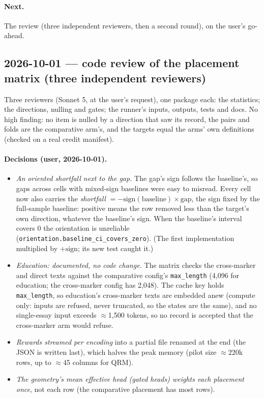 \documentclass{article}
\begin{document}
\paragraph{Next.} The review (three independent reviewers, then a second round), on the user's go-ahead.

\subsection*{2026-10-01 --- code review of the placement matrix (three independent reviewers)}
Three reviewers (Sonnet 5, at the user's request), one package each: the statistics; the directions, nulling and gates;
the runner's inputs, outputs, tests and docs. No high finding: no item is nulled by a direction that saw its record,
the pairs and folds are the comparative arm's, and the targets equal the arms' own definitions (checked on a real
credit manifest).

\paragraph{Decisions (user, 2026-10-01).}
\begin{itemize}
  \item \emph{An oriented shortfall next to the gap.} The gap's sign follows the baseline's, so gaps across cells with
        mixed-sign baselines were easy to misread. Every cell now also carries the \emph{shortfall}
        $=-\mathrm{sign}(\text{baseline})\times\text{gap}$, the sign fixed by the full-sample baseline: positive means the
        row removed less than the target's own direction, whatever the baseline's sign. When the baseline's interval
        covers 0 the orientation is unreliable (\texttt{orientation.baseline\_ci\_covers\_zero}). (The first
        implementation multiplied by $+\mathrm{sign}$; its new test caught it.)
  \item \emph{Education: documented, no code change.} The matrix checks the cross-marker and direct texts against the
        comparative config's \texttt{max\_length} (4{,}096 for education; the cross-marker config has 2{,}048). The
        cache key holds \texttt{max\_length}, so education's cross-marker texts are embedded anew (compute only: inputs
        are refused, never truncated, so the states are the same), and no single-essay input exceeds $\approx$1{,}500
        tokens, so no record is accepted that the cross-marker arm would refuse.
  \item \emph{Rewards streamed per encoding} into a partial file renamed at the end (the JSON is written last), which
        halves the peak memory (pilot size $\approx$220k rows, up to $\approx$45 columns for QRM).
  \item \emph{The geometry's mean effective head (gated heads) weights each placement once}, not each row (the
        comparative placement has most rows).
\end{itemize}
\end{document}
